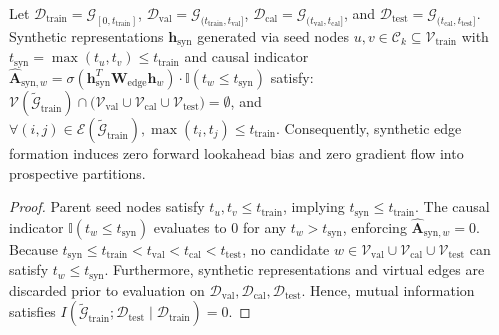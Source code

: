 \begin{lemma}
\label{lem:graphsmote_causality}
Let $\mathcal{D}_{\text{train}} = \mathcal{G}_{[0, t_{\text{train}}]}$, $\mathcal{D}_{\text{val}} = \mathcal{G}_{(t_{\text{train}}, t_{\text{val}}]}$, $\mathcal{D}_{\text{cal}} = \mathcal{G}_{(t_{\text{val}}, t_{\text{cal}}]}$, and $\mathcal{D}_{\text{test}} = \mathcal{G}_{(t_{\text{cal}}, t_{\text{test}}]}$. Synthetic representations $\mathbf{h}_{\text{syn}}$ generated via seed nodes $u, v \in \mathcal{C}_k \subseteq \mathcal{V}_{\text{train}}$ with $t_{\text{syn}} = \max(t_u, t_v) \le t_{\text{train}}$ and causal indicator $\hat{\mathbf{A}}_{\text{syn}, w} = \sigma(\mathbf{h}_{\text{syn}}^T \mathbf{W}_{\text{edge}} \mathbf{h}_w) \cdot \mathbb{I}(t_w \le t_{\text{syn}})$ satisfy:
$\mathcal{V}(\tilde{\mathcal{G}}_{\text{train}}) \cap \big(\mathcal{V}_{\text{val}} \cup \mathcal{V}_{\text{cal}} \cup \mathcal{V}_{\text{test}}\big) = \emptyset$, and $\forall (i, j) \in \mathcal{E}(\tilde{\mathcal{G}}_{\text{train}}), \max(t_i, t_j) \le t_{\text{train}}$. Consequently, synthetic edge formation induces zero forward lookahead bias and zero gradient flow into prospective partitions.
\end{lemma}
\begin{proof}
Parent seed nodes satisfy $t_u, t_v \le t_{\text{train}}$, implying $t_{\text{syn}} \le t_{\text{train}}$. The causal indicator $\mathbb{I}(t_w \le t_{\text{syn}})$ evaluates to 0 for any $t_w > t_{\text{syn}}$, enforcing $\hat{\mathbf{A}}_{\text{syn}, w} = 0$. Because $t_{\text{syn}} \le t_{\text{train}} < t_{\text{val}} < t_{\text{cal}} < t_{\text{test}}$, no candidate $w \in \mathcal{V}_{\text{val}} \cup \mathcal{V}_{\text{cal}} \cup \mathcal{V}_{\text{test}}$ can satisfy $t_w \le t_{\text{syn}}$. Furthermore, synthetic representations and virtual edges are discarded prior to evaluation on $\mathcal{D}_{\text{val}}, \mathcal{D}_{\text{cal}}, \mathcal{D}_{\text{test}}$. Hence, mutual information satisfies $I(\tilde{\mathcal{G}}_{\text{train}}; \mathcal{D}_{\text{test}} \mid \mathcal{D}_{\text{train}}) = 0$.
\end{proof}

